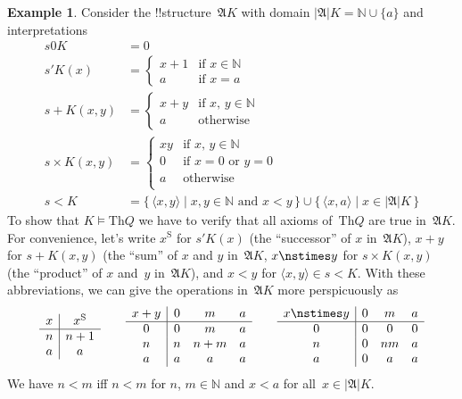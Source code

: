 \documentclass[10pt,a4paper]{article}
\theoremstyle{plain}
\theoremstyle{definition}
\newtheorem{ex}[thm]{Example}
\theoremstyle{remark}
\newcommand*{\ollabel}[1]{\label{#1}}
\providecommand{\Obj}{}
\providecommand{\Struct}{\ensuremath{\mathfrak{A}}}
\providecommand{\Domain}{\ensuremath{|\mathfrak{A}|}}
\providecommand{\Assign}{\ensuremath{s}}
\providecommand{\Sat}[2]{\ensuremath{#1 \models #2}}
\providecommand{\Th}{\ensuremath{\mathrm{Th}}}
\providecommand{\tuple}[1]{\langle #1 \rangle}
\providecommand{\Nat}{\ensuremath{\mathbb{N}}}
\providecommand{\Setabs}[2]{\{\, #1 \mid #2 \,\}}
\providecommand{\nssucc}{\mathrm{S}}
\providecommand{\nsplus}{\mathbin{+}}
\providecommand{\nsless}{<}
\begin{document}
\begin{ex}
\ollabel{ex:model-K-of-Q}
Consider the !!{structure}~$\Struct{K}$ with domain $\Domain{K} = \Nat
\cup \{a\}$ and interpretations
\begin{align*}
  \Assign{\Obj{0}}{K} & = 0\\
  \Assign{\prime}{K}(x) & =
  \begin{cases}
    x+1 & \text{if $x\in \Nat$}\\
    a & \text{if $x = a$}
  \end{cases}\\
  \Assign{+}{K}(x, y) & =
  \begin{cases}
    x+y & \text{if $x$, $y \in\Nat$}\\
    a & \text{otherwise}
  \end{cases}\\
  \Assign{\times}{K}(x, y) & =
  \begin{cases}
    xy & \text{if $x$, $y \in\Nat$}\\
    0 & \text{if $x = 0$ or $y = 0$}\\
    a & \text{otherwise}\\
  \end{cases}\\
  \Assign{<}{K} & =
  \Setabs{\tuple{x,y}}{x, y \in \Nat \text{ and } x<y} \cup
  \Setabs{\tuple{x,a}}{x \in \Domain{K}}
\end{align*}
To show that $\Sat{K}{\Th{Q}}$ we have to verify that all axioms
of~$\Th{Q}$ are true in~$\Struct{K}$.  For convenience, let's write
$x^\nssucc$ for $\Assign{\prime}{K}(x)$ (the ``successor'' of $x$
in~$\Struct{K}$), $x \nsplus y$ for $\Assign{+}{K}(x, y)$ (the ``sum''
of $x$ and $y$ in~$\Struct{K}$, $x \nstimes y$ for
$\Assign{\times}{K}(x, y)$ (the ``product'' of $x$ and~$y$
in~$\Struct{K}$), and $x \nsless y$ for $\tuple{x,y} \in
\Assign{<}{K}$. With these abbreviations, we can give the operations
in~$\Struct{K}$ more perspicuously as
\[
\begin{array}{c|c}
  x & x^\nssucc \\
  \hline
  n & n+1 \\
  a & a
\end{array}
\qquad
\begin{array}{c|ccc}
  x \nsplus y & 0 & m & a \\
  \hline
  0 & 0 & m & a \\
  n & n & n+m & a \\
  a & a & a & a \\
\end{array}
\qquad
\begin{array}{c|ccc}
  x \nstimes y & 0 & m & a \\
  \hline
  0 & 0 & 0 & 0 \\
  n & 0 & nm & a \\
  a & 0 & a & a \\
\end{array}
\]
We have $n \nsless m$ iff $n<m$ for $n$, $m \in \Nat$ and $x \nsless
a$ for all~$x \in \Domain{K}$.


\end{ex}
\end{document}
